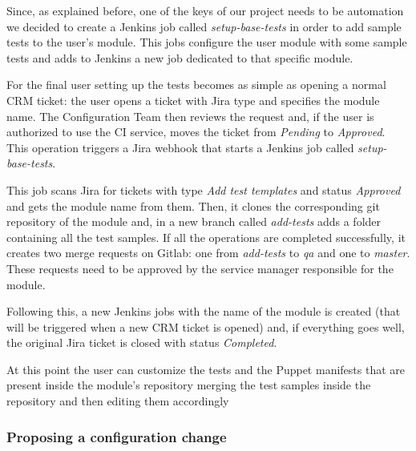 Since, as explained before, one of the keys of our project needs to be
automation we decided to create a Jenkins job called
\textit{setup-base-tests} in order to add sample tests to the user's
module. This jobs configure the user module with some sample tests and
adds to Jenkins a new job dedicated to that specific module.

For the final user setting up the tests becomes as simple as opening
a normal CRM ticket: the user opens a ticket with Jira type  and specifies the module name. The Configuration Team then
reviews the request and, if the user is authorized to use the CI service,
moves the ticket from \textit{Pending} to \textit{Approved}. This
operation triggers a Jira webhook that starts a Jenkins job called
\textit{setup-base-tests}.

This job scans Jira for tickets with type \textit{Add test templates} and
status \textit{Approved} and gets the module name from them. Then, it
clones the corresponding git repository of the module and, in a new branch
called \textit{add-tests} adds a folder containing all the test samples.
If all the operations are completed successfully, it creates two merge
requests on Gitlab: one from \textit{add-tests} to \textit{qa} and one to
\textit{master}. These requests need to be approved by the service manager
responsible for the module.

Following this, a new Jenkins jobs with the name of the module is created
(that will be triggered when a new CRM ticket is opened) and, if
everything goes well, the original Jira ticket is closed with status
\textit{Completed}. 

At this point the user can customize the tests and the Puppet manifests
that are present inside the module's repository merging the test samples
inside the repository and then editing them accordingly 

\subsubsection{Proposing a configuration change}
